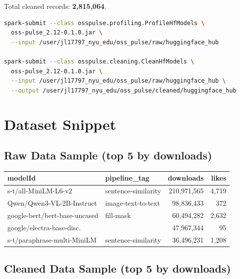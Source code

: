 \documentclass[11pt]{article}
\begin{document}
Total cleaned records: \textbf{2,815,064}.

\begin{lstlisting}[language=bash,caption={Profiling and cleaning on NYU Dataproc}]
spark-submit --class osspulse.profiling.ProfileHfModels \
  oss-pulse_2.12-0.1.0.jar \
  --input /user/jl17797_nyu_edu/oss_pulse/raw/huggingface_hub

spark-submit --class osspulse.cleaning.CleanHfModels \
  oss-pulse_2.12-0.1.0.jar \
  --input /user/jl17797_nyu_edu/oss_pulse/raw/huggingface_hub \
  --output /user/jl17797_nyu_edu/oss_pulse/cleaned/huggingface_hub
\end{lstlisting}

\section{Dataset Snippet}

\subsection{Raw Data Sample (top 5 by downloads)}

\begin{table}[H]
\centering\small
\begin{tabular}{llrr}
\toprule
\textbf{modelId} & \textbf{pipeline\_tag} & \textbf{downloads} & \textbf{likes} \\
\midrule
s-t/all-MiniLM-L6-v2           & sentence-similarity & 210,971,565 & 4,719 \\
Qwen/Qwen3-VL-2B-Instruct      & image-text-to-text  & 98,836,433  & 372 \\
google-bert/bert-base-uncased   & fill-mask           & 60,494,282  & 2,632 \\
google/electra-base-disc.       &                     & 47,967,344  & 95 \\
s-t/paraphrase-multi-MiniLM    & sentence-similarity & 36,496,231  & 1,208 \\
\bottomrule
\end{tabular}
\end{table}

\subsection{Cleaned Data Sample (top 5 by downloads)}
\end{document}
